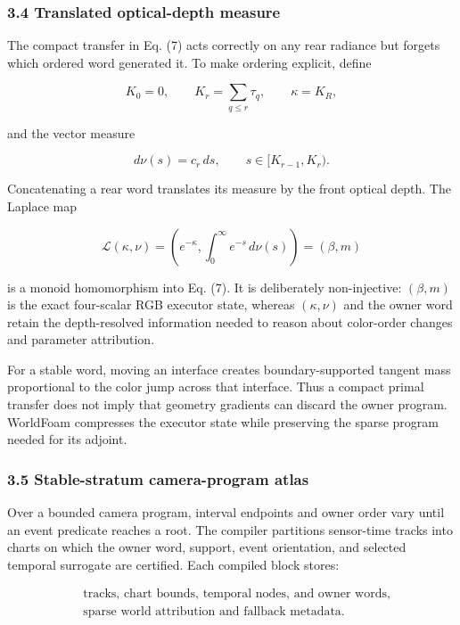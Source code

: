 \documentclass[
]{article}
\begin{document}
\subsubsection{3.4 Translated optical-depth
measure}\label{translated-optical-depth-measure}

The compact transfer in Eq. (7) acts correctly on any rear radiance but
forgets which ordered word generated it. To make ordering explicit,
define

\[
K_0=0,\qquad K_r=\sum_{q\le r}\tau_q,\qquad \kappa=K_R,
\tag{8}
\]

and the vector measure

\[
d\nu(s)=c_r\,ds,
\qquad s\in[K_{r-1},K_r).
\tag{9}
\]

Concatenating a rear word translates its measure by the front optical
depth. The Laplace map

\[
\mathcal L(\kappa,\nu)
=\left(e^{-\kappa},\int_0^\infty e^{-s}\,d\nu(s)\right)
=(\beta,m)
\tag{10}
\]

is a monoid homomorphism into Eq. (7). It is deliberately non-injective:
\((\beta,m)\) is the exact four-scalar RGB executor state, whereas
\((\kappa,\nu)\) and the owner word retain the depth-resolved
information needed to reason about color-order changes and parameter
attribution.

For a stable word, moving an interface creates boundary-supported
tangent mass proportional to the color jump across that interface. Thus
a compact primal transfer does not imply that geometry gradients can
discard the owner program. WorldFoam compresses the executor state while
preserving the sparse program needed for its adjoint.

\subsubsection{3.5 Stable-stratum camera-program
atlas}\label{stable-stratum-camera-program-atlas}

Over a bounded camera program, interval endpoints and owner order vary
until an event predicate reaches a root. The compiler partitions
sensor-time tracks into charts on which the owner word, support, event
orientation, and selected temporal surrogate are certified. Each
compiled block stores:

\[
\begin{aligned}
&\text{tracks, chart bounds, temporal nodes, and owner words},\\
&\text{sparse world attribution and fallback metadata}.
\end{aligned}
\tag{11}
\]
\end{document}
